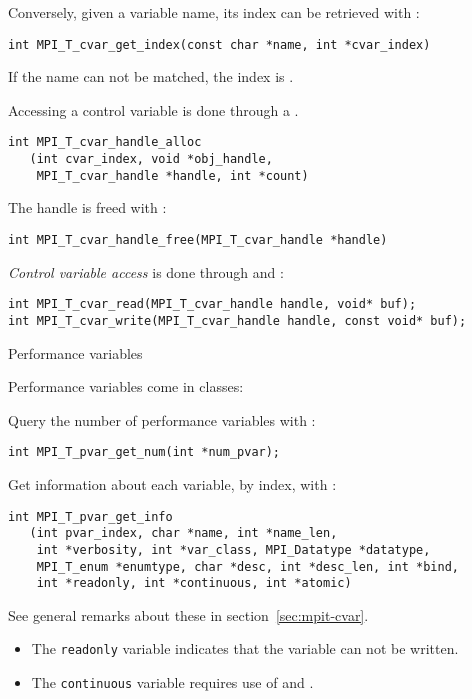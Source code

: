 \begin{mpifour}
Conversely, given a variable name, its index can be retrieved with
:
\begin{lstlisting}
int MPI_T_cvar_get_index(const char *name, int *cvar_index)
\end{lstlisting}
If the name can not be matched, the index is .

Accessing a control variable is done through a
.
\begin{lstlisting}
int MPI_T_cvar_handle_alloc
   (int cvar_index, void *obj_handle,
    MPI_T_cvar_handle *handle, int *count)
\end{lstlisting}
The handle is freed with :
\begin{lstlisting}
int MPI_T_cvar_handle_free(MPI_T_cvar_handle *handle)
\end{lstlisting}

\emph{Control variable access}
is done through  and :
\begin{lstlisting}
int MPI_T_cvar_read(MPI_T_cvar_handle handle, void* buf);
int MPI_T_cvar_write(MPI_T_cvar_handle handle, const void* buf);
\end{lstlisting}

 {Performance variables}

\begin{raggedlist}
  Performance variables come in classes:
\end{raggedlist}

Query the number of performance variables with :
\begin{lstlisting}
int MPI_T_pvar_get_num(int *num_pvar);
\end{lstlisting}
Get information about each variable, by index, with :
\begin{lstlisting}
int MPI_T_pvar_get_info
   (int pvar_index, char *name, int *name_len,
    int *verbosity, int *var_class, MPI_Datatype *datatype,
    MPI_T_enum *enumtype, char *desc, int *desc_len, int *bind,
    int *readonly, int *continuous, int *atomic)
\end{lstlisting}
See general remarks about these in section~\ref{sec:mpit-cvar}.
\begin{itemize}
\item The \lstinline{readonly} variable indicates that the variable can not be written.
\item The \lstinline{continuous} variable requires use of
   and .
\end{itemize}


\end{mpifour}
